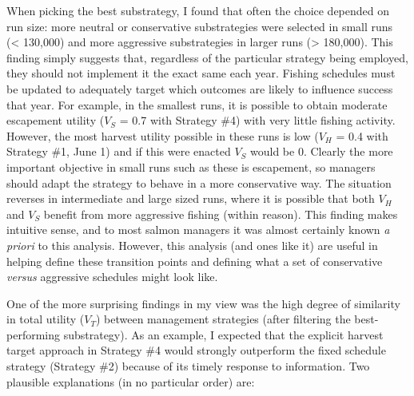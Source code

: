 \documentclass[12pt,]{book}
\theoremstyle{definition}
\theoremstyle{definition}
\theoremstyle{definition}
\theoremstyle{remark}
\begin{document}
When picking the best substrategy, I found that often the choice
depended on run size: more neutral or conservative substrategies were
selected in small runs (\textless{} 130,000) and more aggressive
substrategies in larger runs (\textgreater{} 180,000). This finding
simply suggests that, regardless of the particular strategy being
employed, they should not implement it the exact same each year. Fishing
schedules must be updated to adequately target which outcomes are likely
to influence success that year. For example, in the smallest runs, it is
possible to obtain moderate escapement utility (\(V_S\) = 0.7 with
Strategy \#4) with very little fishing activity. However, the most
harvest utility possible in these runs is low (\(V_H\) = 0.4 with
Strategy \#1, June 1) and if this were enacted \(V_S\) would be 0.
Clearly the more important objective in small runs such as these is
escapement, so managers should adapt the strategy to behave in a more
conservative way. The situation reverses in intermediate and large sized
runs, where it is possible that both \(V_H\) and \(V_S\) benefit from
more aggressive fishing (within reason). This finding makes intuitive
sense, and to most salmon managers it was almost certainly known \emph{a
priori} to this analysis. However, this analysis (and ones like it) are
useful in helping define these transition points and defining what a set
of conservative \emph{versus} aggressive schedules might look like.

One of the more surprising findings in my view was the high degree of
similarity in total utility (\(V_T\)) between management strategies
(after filtering the best-performing substrategy). As an example, I
expected that the explicit harvest target approach in Strategy \#4 would
strongly outperform the fixed schedule strategy (Strategy \#2) because
of its timely response to information. Two plausible explanations (in no
particular order) are:
\end{document}
